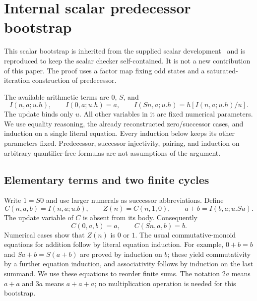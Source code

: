 \documentclass[11pt,letterpaper]{article}
\theoremstyle{definition}\newtheorem{definition}[theorem]{Definition}
\theoremstyle{remark}\newtheorem{remark}[theorem]{Remark}
\begin{document}

\section{Internal scalar predecessor bootstrap}
\label{sec:hybrid-bootstrap}

This scalar bootstrap is inherited from the supplied scalar development~\cite{erasure} and is reproduced to keep the scalar checker self-contained. It is not a new contribution of this paper. The proof uses a factor map fixing odd states and a saturated-iteration construction of predecessor.

The available arithmetic terms are $0$, $S$, and
\[
 I(n,a;u.h),\qquad
 I(0,a;u.h)=a,\qquad
 I(Sn,a;u.h)=h[I(n,a;u.h)/u].
\]
The update binds only $u$.  All other variables in it are fixed numerical
parameters.  We use equality reasoning, the already reconstructed
zero/successor cases, and induction on a single literal equation.
Every induction below keeps its other parameters fixed.  Predecessor,
successor injectivity, pairing, and induction on arbitrary
quantifier-free formulas are not assumptions of the argument.

\subsection{Elementary terms and two finite cycles}

Write $1=S0$ and use larger numerals as successor abbreviations.  Define
\[
 C(n,a,b)=I(n,a;u.b),\qquad
 Z(n)=C(n,1,0),\qquad
 a+b=I(b,a;u.Su).
\]
The update variable of $C$ is absent from its body.  Consequently
\[
 C(0,a,b)=a,\qquad C(Sn,a,b)=b.
\]
Numerical cases show that $Z(n)$ is $0$ or $1$.
The usual commutative-monoid equations for addition follow by literal
equation induction.  For example, $0+b=b$ and $Sa+b=S(a+b)$ are
proved by induction on $b$; these yield commutativity by a further
equation induction, and associativity follows by induction on the last
summand.  We use these equations to reorder finite sums.  The notation
$2a$ means $a+a$ and $3a$ means $a+a+a$; no multiplication operation
is needed for this bootstrap.
\end{document}
